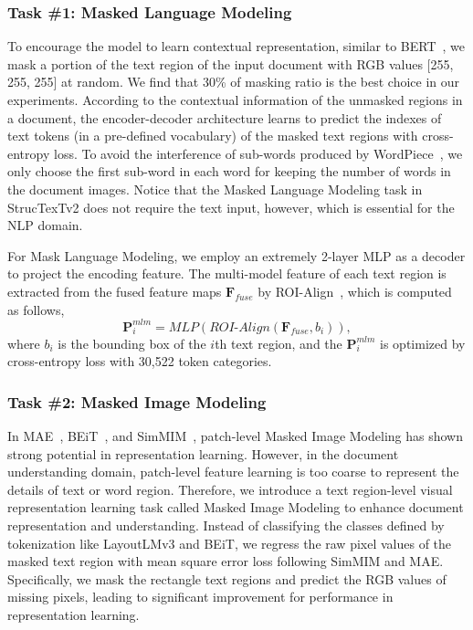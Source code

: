 \documentclass{article} %
\begin{document}
\subsubsection{Task \#1: Masked Language Modeling}
To encourage the model to learn contextual representation, similar to BERT~\cite{devlin2018bert}, we mask a portion of the text region of the input document with RGB values [255, 255, 255] at random. We find that 30\% of masking ratio is the best choice in our experiments. According to the contextual information of the unmasked regions in a document, the encoder-decoder architecture learns to predict the indexes of text tokens (in a pre-defined vocabulary) of the masked text regions with cross-entropy loss. To avoid the interference of sub-words produced by WordPiece~\cite{song2020fast}, we only choose the first sub-word in each word for keeping the number of words in the document images. Notice that the Masked Language Modeling task in StrucTexTv2 does not require the text input, however, which is essential for the NLP domain.

For Mask Language Modeling, we employ an extremely 2-layer MLP as a decoder to project the encoding feature. The multi-model feature of each text region is extracted from the fused feature maps $\mathbf{F}_{fuse}$ by ROI-Align~\cite{ren2015faster}, which is computed as follows,
\begin{equation}
    \mathbf{P}_{i}^{mlm} = \textit{MLP}(\textit{ROI-Align}(\mathbf{F}_{fuse}, b_{i})),
\end{equation}
where $b_{i}$ is the bounding box of the $i$th text region, and the $\mathbf{P}_{i}^{mlm}$ is optimized by cross-entropy loss with 30,522 token categories.

\subsubsection{Task \#2: Masked Image Modeling}
In MAE~\cite{he2021masked}, BEiT~\cite{bao2021beit}, and SimMIM~\cite{Xie00LBYD022}, patch-level Masked Image Modeling has shown strong potential in representation learning. However, in the document understanding domain, patch-level feature learning is too coarse to represent the details of text or word region. Therefore, we introduce a text region-level visual representation learning task called Masked Image Modeling to enhance document representation and understanding. Instead of classifying the classes defined by tokenization like LayoutLMv3 and BEiT, we regress the raw pixel values of the masked text region with mean square error loss following SimMIM and MAE. Specifically, we mask the rectangle text regions and predict the RGB values of missing pixels, leading to significant improvement for performance in representation learning.
\end{document}

